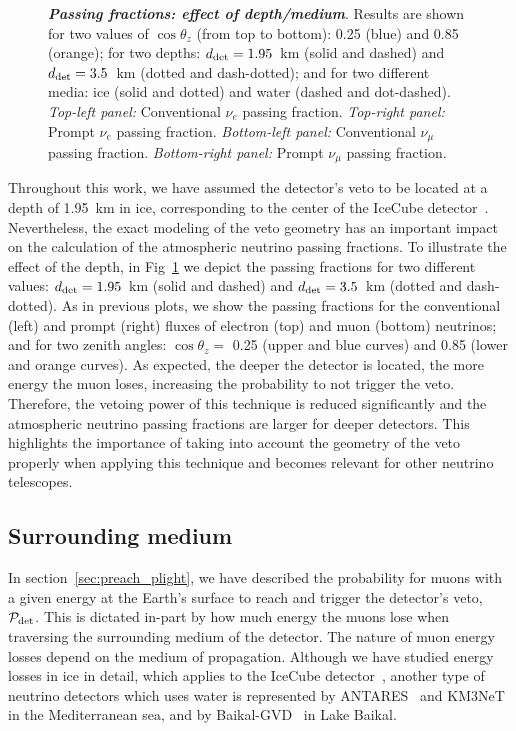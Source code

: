 \documentclass[aps,prd,showpacs,letterpaper,onecolumn,longbibliography,superscriptaddress,notitlepage,nofootinbib]{revtex4-1}%
\newcommand{\Prob}{{\cal P}}
\begin{document}
\begin{figure}[h!]
{    }    
\caption{\textbf{\textit{Passing fractions: effect of depth/medium}}. Results are shown for two values of $\cos\theta_z$ (from top to bottom): 0.25 (blue) and 0.85 (orange); for two depths: $d_{\rm det} = 1.95$~km (solid and dashed) and $d_{\rm det} = 3.5$~km (dotted and dash-dotted); and for two different media: ice (solid and dotted) and water (dashed and dot-dashed). \textit{Top-left panel:} Conventional $\nu_e$ passing fraction. \textit{Top-right panel:} Prompt $\nu_e$ passing fraction. \textit{Bottom-left panel:} Conventional $\nu_\mu$ passing fraction. \textit{Bottom-right panel:} Prompt $\nu_\mu$ passing fraction.} \vspace{1.5cm}
\label{fig:medium-effect}
\end{figure}

Throughout this work, we have assumed the detector's veto to be located at a depth of 1.95~km in ice, corresponding to the center of the IceCube detector~\cite{Achterberg:2006md}. Nevertheless, the exact modeling of the veto geometry has an important impact on the calculation of the atmospheric neutrino passing fractions. To illustrate the effect of the depth, in Fig~\ref{fig:medium-effect} we depict the passing fractions for two different values: $d_{\rm det} = 1.95$~km (solid and dashed) and $d_{\rm det} = 3.5$~km (dotted and dash-dotted). As in previous plots, we show the passing fractions for the conventional (left) and prompt (right) fluxes of electron (top) and muon (bottom) neutrinos; and for two zenith angles: $\cos\theta_z = $ 0.25 (upper and blue curves) and 0.85 (lower and orange curves). As expected, the deeper the detector is located, the more energy the muon loses, increasing the probability to not trigger the veto. Therefore, the vetoing power of this technique is reduced significantly and the atmospheric neutrino passing fractions are larger for deeper detectors. This highlights the importance of taking into account the geometry of the veto properly when applying this technique and becomes relevant for other neutrino telescopes.

\pagebreak

\subsection{Surrounding medium}
\label{sec:medium}

In section~\ref{sec:preach_plight}, we have described the probability for muons with a given energy at the Earth's surface to reach and trigger the detector's veto, $\Prob_{\rm det}$. This is dictated in-part by how much energy the muons lose when traversing the surrounding medium of the detector. The nature of muon energy losses depend on the medium of propagation. Although we have studied energy losses in ice in detail, which applies to the IceCube detector~\cite{Achterberg:2006md}, another type of neutrino detectors which uses water is represented by ANTARES~\cite{Collaboration:2011nsa} and KM3NeT~\cite{Adrian-Martinez:2016fdl} in the Mediterranean sea, and by Baikal-GVD~\cite{Baikal2017} in Lake Baikal.
\end{document}
